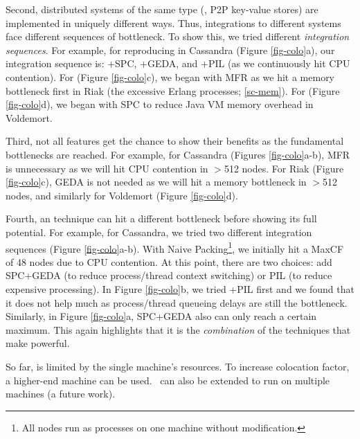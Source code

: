 Second, distributed systems of the same type (\eg, P2P key-value stores)
are implemented in uniquely different ways.  Thus, integrations to
different systems face different sequences of bottleneck.  To show this,
we tried different {\em integration sequences}.  For example, for
reproducing \caone in Cassandra (Figure \ref{fig-colo}a), our integration
sequence is: +SPC, +GEDA, and +PIL (as we continuously hit CPU
contention).
%
For \riakone (Figure \ref{fig-colo}c), we began with MFR
as we hit a memory bottleneck first in Riak (the excessive Erlang processes;
\sec\ref{sc-mem}).
%
For \voldone (Figure \ref{fig-colo}d), we began with SPC to reduce Java VM
memory overhead in Voldemort.


Third, not all features get the chance to show their benefits as the
fundamental bottlenecks are reached.  For example, for Cassandra \caone
(Figures \ref{fig-colo}a-b), MFR is unnecessary as we will hit CPU
contention in $>$512 nodes.  For Riak \riakone (Figure \ref{fig-colo}c),
GEDA is not needed as we will hit a memory bottleneck in $>$512 nodes, and
similarly for Voldemort \voldone (Figure \ref{fig-colo}d).

Fourth, an \sck technique can hit a different bottleneck before showing
its full potential.  For example, for Cassandra, we tried two different
integration sequences (Figure \ref{fig-colo}a-b).  With 
Naive Packing\footnote{All nodes run as processes on
one machine without modification.}, we
initially hit a MaxCF of 48 nodes due to CPU contention.  At this point,
there are two choices: add SPC+GEDA (to reduce process/thread context
switching) or PIL (to reduce expensive processing).  In Figure
\ref{fig-colo}b, we tried +PIL first and we found that it does not help
much as process/thread queueing delays are still the bottleneck.
Similarly, in Figure \ref{fig-colo}a, SPC+GEDA also can only reach a
certain maximum.  This again highlights that it is the {\em combination} 
of the
techniques that make \sck powerful.


So far, \sck is limited by the single machine's resources.  To increase
colocation factor, a higher-end machine can be used.  \sck\ can also be
extended to run on multiple machines (a future work).

